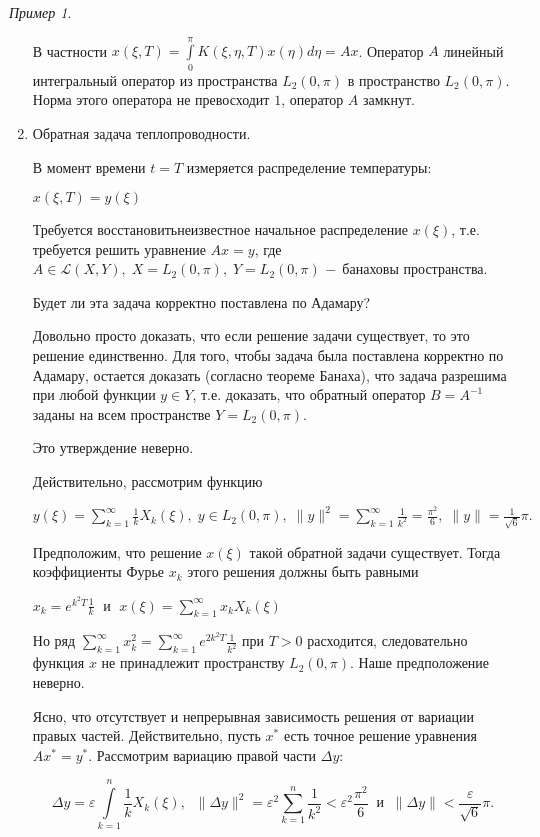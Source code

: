 \documentclass[12pt,a4paper,titlepage, oneside]{book}
\theoremstyle{definition}
\theoremstyle{plain}
\theoremstyle{remark}
\theoremstyle{remark}
\newtheorem*{example}{Пример}
\theoremstyle{remark}
\theoremstyle{plain}
\theoremstyle{plain}
\begin{document}
\begin{example}
\begin{enumerate}
В частности $x(\xi,T) = \displaystyle\int\limits_0^\pi K(\xi, \eta, T) x(\eta)d\eta = Ax$. Оператор $A$ линейный интегральный оператор из пространства $L_2(0, \pi)$ в пространство $L_2(0, \pi)$. Норма этого оператора не превосходит $1$, оператор $A$ замкнут.

	\item Обратная задача теплопроводности.

В момент времени $t = T$ измеряется  распределение температуры:
\begin{center}
$x(\xi, T) = y(\xi)$
\end{center}

Требуется \guillemotleft восстановить\guillemotright \;неизвестное начальное распределение $x(\xi)$, т.е. требуется решить уравнение $Ax = y$, где $A\in\mathscr{L}(X,Y), \; X = L_{2}(0, \pi), \; Y = L_{2}(0, \pi)$ $\-- $ банаховы пространства.

Будет ли эта задача корректно поставлена по Адамару?

Довольно просто доказать, что если решение задачи существует, то это решение единственно. Для того, чтобы задача была поставлена корректно по Адамару, остается доказать (согласно теореме Банаха), что задача разрешима при любой функции $y \in Y$, т.е. доказать, что обратный оператор $B = A^{-1}$ заданы на всем пространстве $Y = L_{2}(0, \pi)$.

Это утверждение неверно.

Действительно, рассмотрим функцию
\begin{center}
$y(\xi)=\displaystyle\sum\limits_{k=1}^{\infty} \frac{1}{k} X_k(\xi) ,  \; y\in L_{2}(0, \pi), \; \|y\|^2 = \sum\limits_{k=1}^{\infty} \frac{1}{k^2} = \frac{\pi^2}{6} ,  \; \|y\| = \frac{1}{\sqrt{6}}\pi \mbox{.}$
\end{center}

Предположим, что решение $x(\xi)$ такой обратной задачи существует. Тогда коэффициенты Фурье $x_k$ этого решения должны быть равными
\begin{center}
$x_k=e^{k^2 T} \frac{1}{k} \; \mbox{ и } \; x(\xi) = \displaystyle\sum\limits_{k=1}^{\infty} x_k X_k(\xi)$
\end{center}

Но ряд $\displaystyle\sum\limits_{k=1}^{\infty} x_k^2 = \sum\limits_{k=1}^{\infty} e^{2k^2 T} \frac{1}{k^2}$ при $T > 0$ расходится, следовательно функция $x$ не принадлежит пространству $L_2(0,\pi)$. Наше предположение неверно.

Ясно, что отсутствует и непрерывная зависимость решения от вариации правых частей. Действительно, пусть $x^{*}$ есть точное решение уравнения $Ax^*=y^*$. Рассмотрим вариацию правой части  $\Delta y$:
\begin{center}
$$\Delta y = \varepsilon \int\limits_{k=1}^{n} \frac{1}{k} X_k(\xi) , \; \; \| \Delta y\|^2 = \varepsilon ^2 \sum\limits_{k=1}^{n} \frac{1}{k^2} < \varepsilon^2 \frac{\pi ^2}{6} \; \; \mbox{и} \; \; \| \Delta y \| < \frac{\varepsilon}{\sqrt{6}}\pi.$$
\end{center}


\end{enumerate}
\end{example}
\end{document}
